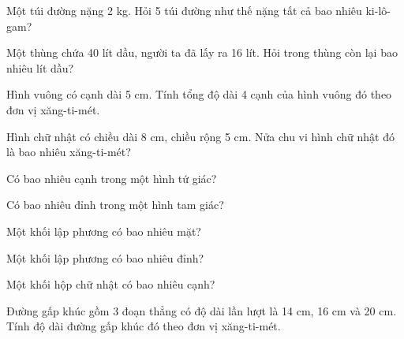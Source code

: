 \begin{ex}
Một túi đường nặng 2 kg. Hỏi 5 túi đường như thế nặng tất cả bao nhiêu ki-lô-gam?
\end{ex}

\begin{ex}
Một thùng chứa 40 lít dầu, người ta đã lấy ra 16 lít. Hỏi trong thùng còn lại bao nhiêu lít dầu?
\end{ex}

\begin{ex}
Hình vuông có cạnh dài 5 cm. Tính tổng độ dài 4 cạnh của hình vuông đó theo đơn vị xăng-ti-mét.
\end{ex}

\begin{ex}
Hình chữ nhật có chiều dài 8 cm, chiều rộng 5 cm. Nửa chu vi hình chữ nhật đó là bao nhiêu xăng-ti-mét?
\end{ex}

\begin{ex}
Có bao nhiêu cạnh trong một hình tứ giác?
\end{ex}

\begin{ex}
Có bao nhiêu đỉnh trong một hình tam giác?
\end{ex}

\begin{ex}
Một khối lập phương có bao nhiêu mặt?
\end{ex}

\begin{ex}
Một khối lập phương có bao nhiêu đỉnh?
\end{ex}

\begin{ex}
Một khối hộp chữ nhật có bao nhiêu cạnh?
\end{ex}

\begin{ex}
Đường gấp khúc gồm 3 đoạn thẳng có độ dài lần lượt là 14 cm, 16 cm và 20 cm. Tính độ dài đường gấp khúc đó theo đơn vị xăng-ti-mét.
\end{ex}

